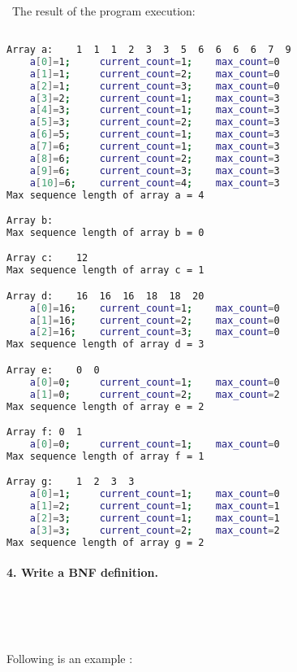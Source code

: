 \documentclass{article}
\begin{document}
	\paragraph{}\
		\paragraph{}\
			\paragraph{}\
				\paragraph{}\
	
	\rmfamily\
		\noindent The result of the program execution:
		
	\ttfamily
	\begin{lstlisting}[language=bash]

Array a:    1  1  1  2  3  3  5  6  6  6  6  7  9
    a[0]=1; 	current_count=1; 	max_count=0
    a[1]=1; 	current_count=2; 	max_count=0
    a[2]=1; 	current_count=3; 	max_count=0
    a[3]=2; 	current_count=1; 	max_count=3
    a[4]=3; 	current_count=1; 	max_count=3
    a[5]=3; 	current_count=2; 	max_count=3
    a[6]=5; 	current_count=1; 	max_count=3
    a[7]=6; 	current_count=1; 	max_count=3
    a[8]=6; 	current_count=2; 	max_count=3
    a[9]=6; 	current_count=3; 	max_count=3
    a[10]=6; 	current_count=4; 	max_count=3
Max sequence length of array a = 4

Array b:
Max sequence length of array b = 0

Array c:    12
Max sequence length of array c = 1

Array d:    16  16  16  18  18  20
    a[0]=16; 	current_count=1; 	max_count=0
    a[1]=16; 	current_count=2; 	max_count=0
    a[2]=16; 	current_count=3; 	max_count=0
Max sequence length of array d = 3

Array e:    0  0
    a[0]=0; 	current_count=1; 	max_count=0
    a[1]=0; 	current_count=2; 	max_count=2
Max sequence length of array e = 2

Array f: 0  1
    a[0]=0; 	current_count=1; 	max_count=0
Max sequence length of array f = 1

Array g:    1  2  3  3
    a[0]=1; 	current_count=1; 	max_count=0
    a[1]=2; 	current_count=1; 	max_count=1
    a[2]=3; 	current_count=1; 	max_count=1
    a[3]=3; 	current_count=2; 	max_count=2
Max sequence length of array g = 2

	\end{lstlisting}
	
	

	
	
	\rmfamily
	
	\paragraph{4. Write a BNF definition. }\
	
	\rmfamily\

	
		Following is an example :
		
	\ttfamily\

	
\end{document}
